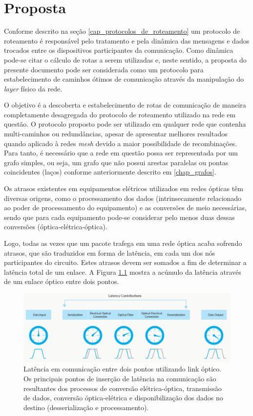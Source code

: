 \chapter{Proposta}
\label{capitulo_proposta}
Conforme descrito na seção \ref{cap_protocolos_de_roteamento} um protocolo de roteamento é responsável pelo tratamento e pela dinâmica das mensagens e dados trocados entre os dispositivos participantes da comunicação. Como dinâmica pode-se citar o cálculo de rotas a serem utilizadas e, neste sentido, a proposta do presente documento pode ser considerada como um protocolo para estabelecimento de caminhos ótimos de comunicação através da manipulação do \emph{layer} físico da rede.

O objetivo é a descoberta e estabelecimento de rotas de comunicação de maneira completamente desagregada do protocolo de roteamento utilizado na rede em questão. O protocolo proposto pode ser utilizado em qualquer rede que contenha multi-caminhos ou redundâncias, apesar de apresentar melhores resultados quando aplicado à redes \emph{mesh} devido a maior possibilidade de recombinações. Para tanto, é necessário que a rede em questão possa ser representada por um grafo simples, ou seja, um grafo que não possui arestas paralelas ou pontas coincidentes (laços) conforme anteriormente descrito em \ref{chap_grafos}.

Os atrasos existentes em equipamentos elétricos utilizados em redes ópticas têm diversas origens, como o processamento dos dados (intrinsecamente relacionado ao poder de processamento do equipamento) e as conversões de meio necessárias, sendo que para cada equipamento pode-se considerar pelo menos duas dessas conversões (óptica-elétrica-óptica). 

Logo, todas as vezes que um pacote trafega em uma rede óptica acaba sofrendo atrasos, que são traduzidos em forma de latência, em cada um dos nós participantes do circuito. Estes atrasos devem ser somados a fim de determinar a latência total de um enlace. A Figura \ref{fig_latency_link} mostra a acúmulo da latência através de um enlace óptico entre dois pontos. 

\begin{figure} [!htb]%
	\centering
	\includegraphics[width=1\textwidth]{./figuras/latency-link.png}
	\caption[Latência de Link]{Latência em comunicação entre dois pontos utilizando link óptico. Os principais pontos de inserção de latência na comunicação são resultantes dos processos de conversão elétrica-óptica, transmissão de dados, conversão óptica-elétrica e disponibilização dos dados no destino (desserialização e processamento).}
	\label{fig_latency_link}
\end{figure}

